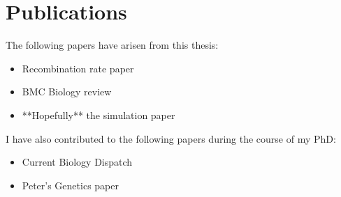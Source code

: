 \chapter*{Publications}

The following papers have arisen from this thesis:
\begin{itemize}
  \item Recombination rate paper
  \item BMC Biology review
  \item **Hopefully** the simulation paper
\end{itemize}

I have also contributed to the following papers during the course of my PhD:
\begin{itemize}
  \item Current Biology Dispatch
  \item Peter's Genetics paper
\end{itemize}